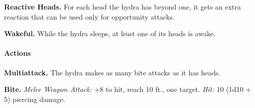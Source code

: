 \documentclass[
]{article}
\begin{document}
\textbf{Reactive Heads.} For each head the hydra has beyond one, it gets
an extra reaction that can be used only for opportunity attacks.

\textbf{Wakeful.} While the hydra sleeps, at least one of its heads is
awake.

\hypertarget{actions-9}{%
\paragraph{Actions}\label{actions-9}}

\textbf{Multiattack.} The hydra makes as many bite attacks as it has
heads.

\textbf{Bite.} \emph{Melee Weapon Attack:} +8 to hit, reach 10 ft., one
target. \emph{Hit:} 10 (1d10 + 5) piercing damage.
\end{document}
